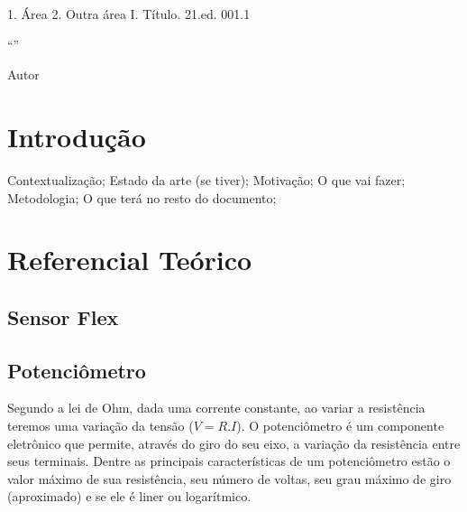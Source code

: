\documentclass{../ufpatcc}
\begin{document}
  \capa
  \folhaderosto
                     {1. Área 2. Outra área I. Título.}
                     {21.ed. 001.1}
  \begin{dedicatoria}
    \lipsum[13]
  \end{dedicatoria}
  \begin{agradecimentos}
    \lipsum[1-5]
  \end{agradecimentos}
  \begin{epigrafe}
    ``\lipsum*[101]''\par
      Autor
  \end{epigrafe}
  \begin{resumo}
    \lipsum[1]
  \end{resumo}
  \begin{abstract}
    \lipsum[1]
  \end{abstract}
  \tableofcontents

	
  \chapter{Introdução} %
		
		Contextualização; Estado da arte (se tiver); Motivação; O que vai fazer; Metodologia; O que terá no resto do documento;


	\chapter{Referencial Teórico}

		\section{Sensor Flex}

		\section{Potenciômetro}
		Segundo a lei de Ohm, dada uma corrente constante, ao variar a resistência teremos uma variação da tensão ($V = R.I$). O potenciômetro é um componente eletrônico que permite, através do giro do seu eixo, a variação da resistência entre seus terminais. Dentre as principais características de um potenciômetro estão o valor máximo de sua resistência, seu número de voltas, seu grau máximo de giro (aproximado) e se ele é liner ou logarítmico.
\end{document}
